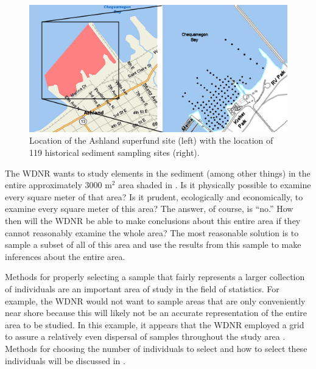 \documentclass[10pt,openany]{book}\usepackage[]{graphicx}\usepackage[]{color}
\begin{document}
\begin{figure}[htbp]
  \centering
    \includegraphics[width=6in]{Figs/Kreher_Park_Map.png}
  \caption{Location of the Ashland superfund site (left) with the location of 119 historical sediment sampling sites (right).}
  \label{fig:KreherParkMap}
\end{figure}

The WDNR wants to study elements in the sediment (among other things) in the entire approximately 3000 m$^2$ area shaded in .  Is it physically possible to examine every square meter of that area?  Is it prudent, ecologically and economically, to examine every square meter of this area?  The answer, of course, is ``no.''  How then will the WDNR be able to make conclusions about this entire area if they cannot reasonably examine the whole area?  The most reasonable solution is to sample a subset of all of this area and use the results from this sample to make inferences about the entire area.

Methods for properly selecting a sample that fairly represents a larger collection of individuals are an important area of study in the field of statistics.  For example, the WDNR would not want to sample areas that are only conveniently near shore because this will likely not be an accurate representation of the entire area to be studied.  In this example, it appears that the WDNR employed a grid to assure a relatively even dispersal of samples throughout the study area .  Methods for choosing the number of individuals to select and how to select these individuals will be discussed in .
\end{document}
